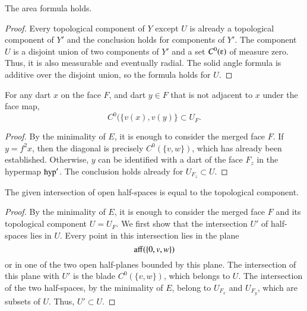 {{\begin{lemma} The area formula holds.
\end{lemma}

\begin{proof} Every topological component of $Y$ 
except $U$ is already a topological component of $Y'$ and the conclusion
holds for components of $Y'$.  The component $U$ is a disjoint union of two
components of $Y'$ and a set $C^0(\e)$ of measure zero.  Thus, it
is also measurable and eventually radial.  The solid angle formula is
additive over the disjoint union, so the formula holds for $U$.
\end{proof}

\begin{lemma}  For any dart $x$ on the face $F$, and dart $y\in F$ that is not adjacent to $x$ under the face map, 
$$
C^0(\{v(x),v(y)\} \subset U_F.
$$
\end{lemma}

\begin{proof}
By the minimality of $E$, it is enough to consider the merged face $F$.  
If $y=f^2x$, then the diagonal is precisely $C^0(\{v,w\})$,
which has already been established.  Otherwise, $y$ can be identified with
a dart of the face $F_z$ in the hypermap ${\operatorname{hyp}}'$.  The conclusion holds
already for $U_{F_z}\subset U$.  
\end{proof}


\begin{lemma} The given intersection of open half-spaces is equal
to the topological component. 
\end{lemma}

\begin{proof}
By the minimality of $E$, it is enough to consider
the merged face $F$ and its topological component $U=U_F$.
We first show that the intersection $U'$ of half-spaces lies in $U$.
Every point in this intersection lies in the plane
$$
{\operatorname{aff}}(\{0,v,w\})
$$
or in one of the two open half-planes bounded by this plane.  The intersection
of this plane with $U'$ is the blade $C^0(\{v,w\})$, which belongs
to $U$. The intersection of the two half-spaces, by the minimality of $E$,
belong to $U_{F_x}$ and $U_{F_y}$, which are subsets of $U$.  Thus, $U'\subset U$.


\end{proof}}}
